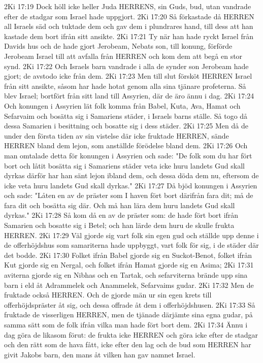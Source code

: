 2Ki 17:19  Dock höll icke heller Juda HERRENS, sin Guds, bud, utan vandrade efter de stadgar som Israel hade uppgjort.
2Ki 17:20  Så förkastade då HERREN all Israels säd och tuktade dem och gav dem i plundrares hand, till dess att han kastade dem bort ifrån sitt ansikte.
2Ki 17:21  Ty när han hade ryckt Israel från Davids hus och de hade gjort Jerobeam, Nebats son, till konung, förförde Jerobeam Israel till att avfalla från HERREN och kom dem att begå en stor synd.
2Ki 17:22  Och Israels barn vandrade i alla de synder son Jerobeam hade gjort; de avstodo icke från dem.
2Ki 17:23  Men till slut försköt HERREN Israel från sitt ansikte, såsom har hade hotat genom alla sina tjänare profeterna. Så blev Israel; bortfört från sitt land till Assyrien, där de äro ännu i dag.
2Ki 17:24  Och konungen i Assyrien lät folk komma från Babel, Kuta, Ava, Hamat och Sefarvaim och bosätta sig i Samariens städer, i Israels barns ställe. Så togo då dessa Samarien i besittning och bosatte sig i dess städer.
2Ki 17:25  Men då de under den första tiden av sin vistelse där icke fruktade HERREN, sände HERREN bland dem lejon, som anställde förödelse bland dem.
2Ki 17:26  Och man omtalade detta för konungen i Assyrien och sade: "De folk som du har fört bort och låtit bosätta sig i Samariens städer veta icke huru landets Gud skall dyrkas därför har han sänt lejon ibland dem, och dessa döda dem nu, eftersom de icke veta huru landets Gud skall dyrkas."
2Ki 17:27  Då bjöd konungen i Assyrien och sade: "Låten en av de präster som I haven fört bort därifrån fara dit; må de fara dit och bosätta sig där. Och må han lära dem huru landets Gud skall dyrkas."
2Ki 17:28  Så kom då en av de präster som: de hade fört bort ifrån Samarien och bosatte sig i Betel; och han lärde dem huru de skulle frukta HERREN.
2Ki 17:29  Väl gjorde sig vart folk sin egen gud och ställde upp denne i de offerhöjdshus som samariterna hade uppbyggt, vart folk för sig, i de städer där det bodde.
2Ki 17:30  Folket ifrån Babel gjorde sig en Suckot-Benot, folket ifrån Kut gjorde sig en Nergal, och folket ifrån Hamat gjorde sig en Asima;
2Ki 17:31  aviterna gjorde sig en Nibhas och en Tartak, och sefarviterna brände upp sina barn i eld åt Adrammelek och Anammelek, Sefarvaims gudar.
2Ki 17:32  Men de fruktade också HERREN. Och de gjorde män ur sin egen krets till offerhöjdspräster åt sig, och dessa offrade åt dem i offerhöjdshusen.
2Ki 17:33  Så fruktade de visserligen HERREN, men de tjänade därjämte sina egna gudar, på samma sätt som de folk ifrån vilka man hade fört bort dem.
2Ki 17:34  Ännu i dag göra de likasom förut: de frukta icke HERREN och göra icke efter de stadgar och den rätt som de hava fått, icke efter den lag och de bud som HERREN har givit Jakobs barn, den mans åt vilken han gav namnet Israel.
